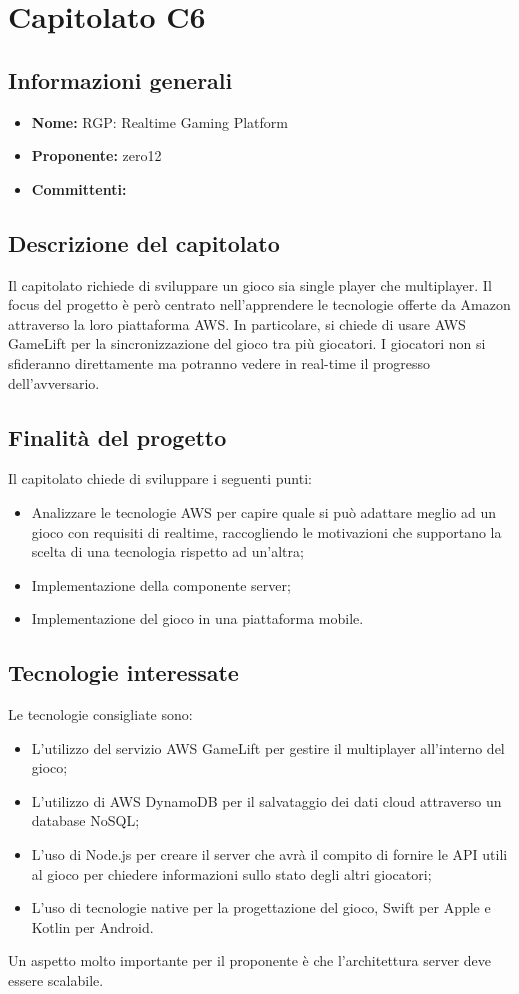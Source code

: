 \section{Capitolato C6}

\subsection{Informazioni generali}
\begin{itemize}
\item \textbf{Nome:} RGP: Realtime Gaming Platform
\item \textbf{Proponente:} zero12
\item \textbf{Committenti:} \committenti{}
\end{itemize}

\subsection{Descrizione del capitolato}
Il capitolato richiede di sviluppare un gioco sia single player che multiplayer.
Il focus del progetto è però centrato nell'apprendere le tecnologie offerte da Amazon attraverso la loro piattaforma AWS.
In particolare, si chiede di usare AWS GameLift per la sincronizzazione del gioco tra più giocatori.
I giocatori non si sfideranno direttamente ma potranno vedere in real-time il progresso dell'avversario.

\subsection{Finalità del progetto}
Il capitolato chiede di sviluppare i seguenti punti:
\begin{itemize}
\item Analizzare le tecnologie AWS per capire quale si può adattare meglio ad un gioco con requisiti di realtime, raccogliendo le motivazioni che supportano la scelta di una tecnologia rispetto ad un'altra;
\item Implementazione della componente server;
\item Implementazione del gioco in una piattaforma mobile.
\end{itemize}

\subsection{Tecnologie interessate}
Le tecnologie consigliate sono:
\begin{itemize}
\item L'utilizzo del servizio AWS GameLift per gestire il multiplayer all'interno del gioco;
\item L'utilizzo di AWS DynamoDB per il salvataggio dei dati cloud attraverso un database NoSQL;
\item L'uso di Node.js per creare il server che avrà il compito di fornire le API utili al gioco per chiedere informazioni sullo stato degli altri giocatori;
\item L'uso di tecnologie native per la progettazione del gioco, Swift per Apple e Kotlin per Android.
\end{itemize}
Un aspetto molto importante per il proponente è che l'architettura server deve essere scalabile.


